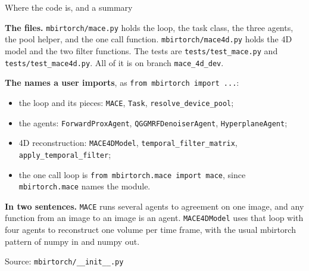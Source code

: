 \documentclass[aspectratio=169,10pt]{beamer}
\newcommand{\source}[1]{\par\vfill{\scriptsize\textcolor{inkGray}{Source: #1}\par}}
\newcommand{\head}[1]{\textbf{#1}}
\begin{document}
\begin{frame}{Where the code is, and a summary}
  \vspace{0pt}
  {\footnotesize
  \head{The files.}  \texttt{mbirtorch/mace.py} holds the loop, the task
  class, the three agents, the pool helper, and the one call function.
  \texttt{mbirtorch/mace4d.py} holds the 4D model and the two filter
  functions.  The tests are \texttt{tests/test\_mace.py} and
  \texttt{tests/test\_mace4d.py}.  All of it is on branch
  \texttt{mace\_4d\_dev}.\par\vspace{5pt}
  \head{The names a user imports}, as \texttt{from mbirtorch import ...}:
  \begin{itemize}\setlength{\itemsep}{1pt}
    \item the loop and its pieces: \texttt{MACE}, \texttt{Task},
      \texttt{resolve\_device\_pool};
    \item the agents: \texttt{ForwardProxAgent},
      \texttt{QGGMRFDenoiserAgent}, \texttt{HyperplaneAgent};
    \item 4D reconstruction: \texttt{MACE4DModel},
      \texttt{temporal\_filter\_matrix}, \texttt{apply\_temporal\_filter};
    \item the one call loop is \texttt{from mbirtorch.mace import mace},
      since \texttt{mbirtorch.mace} names the module.
  \end{itemize}\vspace{3pt}
  \head{In two sentences.}  \texttt{MACE} runs several agents to
  agreement on one image, and any function from an image to an image is
  an agent.  \texttt{MACE4DModel} uses that loop with four agents to
  reconstruct one volume per time frame, with the usual mbirtorch
  pattern of numpy in and numpy out.\par\vspace{5pt}
  }
  \source{\texttt{mbirtorch/\_\_init\_\_.py}}
\end{frame}
\end{document}
